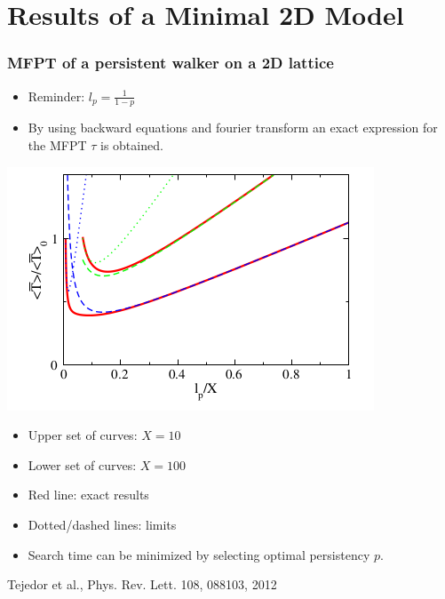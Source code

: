 \documentclass[11pt]{beamer}
\begin{document}
\section{Results of a Minimal 2D Model}
\begin{frame}
 \frametitle{MFPT of a persistent walker on a 2D lattice}
 \begin{itemize}
  \item Reminder: $l_p = \frac{1}{1-p}$
  \item By using backward equations and fourier transform an exact expression for the MFPT $\tau$ is obtained.
 \end{itemize}
 \begin{minipage}[h]{0.6\textwidth}
  \centering
   \includegraphics[width=0.9\linewidth]{gfx/mfpt-exact.png}
 \end{minipage}
 \begin{minipage}[h]{0.39\textwidth}
 \begin{itemize}
  \item Upper set of curves: $X=10$
  \item Lower set of curves: $X=100$
  \item Red line: exact results
  \item Dotted/dashed lines: limits
 \end{itemize}
 \end{minipage}
 \begin{itemize}
  \item Search time can be minimized by selecting optimal persistency $p$.
 \end{itemize}
 \centering
 {\tiny Tejedor et al., Phys. Rev. Lett. 108, 088103, 2012}
\end{frame}
\end{document}
